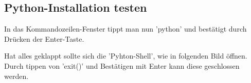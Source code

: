 \documentclass[ngerman,oneside, a4letter]{article}
\begin{document}
\clearpage
\subsection{Python-Installation testen}
In das Kommandozeilen-Fenster tippt man nun 'python' und bestätigt durch Drücken der Enter-Taste.
\begin{center}
\end{center}
Hat alles geklappt sollte sich die 'Pyhton-Shell', wie in folgenden Bild öffnen.
\\
Durch tippen von 'exit()' und Bestätigen mit Enter kann diese geschlossen werden.
\begin{center}
\end{center}

\clearpage
\end{document}
